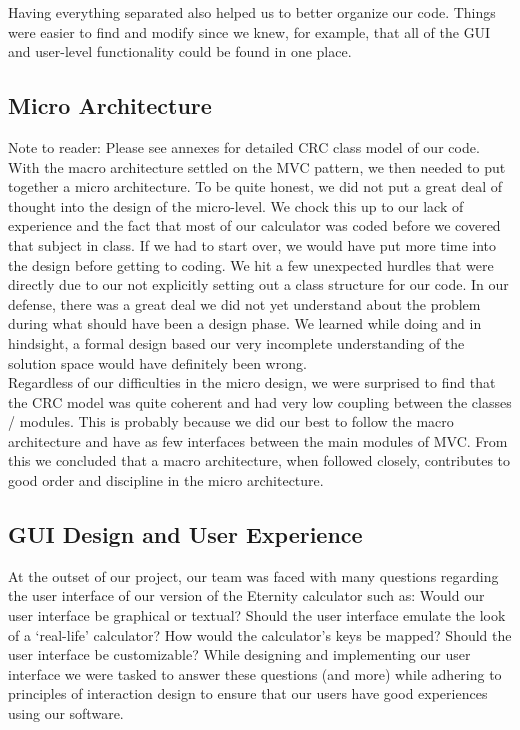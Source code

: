 \documentclass[a4paper, 12pt]{article}
\begin{document}
Having everything separated also helped us to better organize our code. Things were easier to find and modify since we knew, for example, that all of the GUI and user-level functionality could be found in one place.


\subsection{Micro Architecture}


Note to reader: Please see annexes for detailed CRC class model of our code.
\\

With the macro architecture settled on the MVC pattern, we then needed to put together a micro architecture. To be quite honest, we did not put a great deal of thought into the design of the micro-level. We chock this up to our lack of experience and the fact that most of our calculator was coded before we covered that subject in class. If we had to start over, we would have put more time into the design before getting to coding. We hit a few unexpected hurdles that were directly due to our not explicitly setting out a class structure for our code. In our defense, there was a great deal we did not yet understand about the problem during what should have been a design phase. We learned while doing and in hindsight, a formal design based our very incomplete understanding of the solution space would have definitely been wrong.
\\

Regardless of our difficulties in the micro design, we were surprised to find that the CRC model was quite coherent and had very low coupling between the classes / modules. This is probably because we did our best to follow the macro architecture and have as few interfaces between the main modules of MVC. From this we concluded that a macro architecture, when followed closely, contributes to good order and discipline in the micro architecture.


\subsection{GUI Design and User Experience}

At the outset of our project, our team was faced with many questions regarding the user interface of our version of the Eternity calculator such as: Would our user interface be graphical or textual? Should the user interface emulate the look of a ‘real-life’ calculator? How would the calculator’s keys be mapped? Should the user interface be customizable? While designing and implementing our user interface we were tasked to answer these questions (and more) while adhering to principles of interaction design to ensure that our users have good experiences using our software. 
\\
\end{document}
